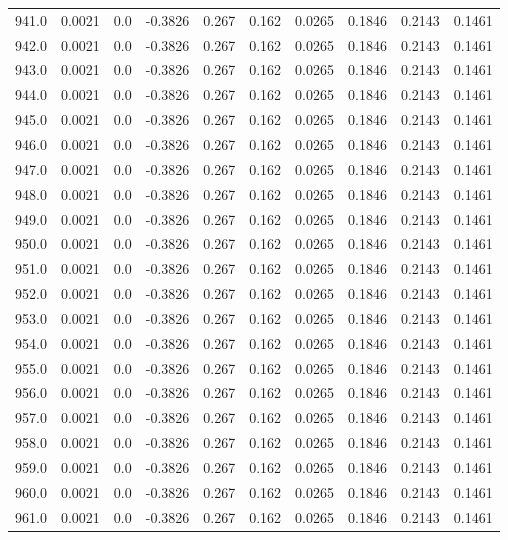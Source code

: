 \begin{longtable}{lrrrrrrrrr}
941.0 & 0.0021 & 0.0 & -0.3826 & 0.267 & 0.162 & 0.0265 & 0.1846 & 0.2143 & 0.1461 \\
942.0 & 0.0021 & 0.0 & -0.3826 & 0.267 & 0.162 & 0.0265 & 0.1846 & 0.2143 & 0.1461 \\
943.0 & 0.0021 & 0.0 & -0.3826 & 0.267 & 0.162 & 0.0265 & 0.1846 & 0.2143 & 0.1461 \\
944.0 & 0.0021 & 0.0 & -0.3826 & 0.267 & 0.162 & 0.0265 & 0.1846 & 0.2143 & 0.1461 \\
945.0 & 0.0021 & 0.0 & -0.3826 & 0.267 & 0.162 & 0.0265 & 0.1846 & 0.2143 & 0.1461 \\
946.0 & 0.0021 & 0.0 & -0.3826 & 0.267 & 0.162 & 0.0265 & 0.1846 & 0.2143 & 0.1461 \\
947.0 & 0.0021 & 0.0 & -0.3826 & 0.267 & 0.162 & 0.0265 & 0.1846 & 0.2143 & 0.1461 \\
948.0 & 0.0021 & 0.0 & -0.3826 & 0.267 & 0.162 & 0.0265 & 0.1846 & 0.2143 & 0.1461 \\
949.0 & 0.0021 & 0.0 & -0.3826 & 0.267 & 0.162 & 0.0265 & 0.1846 & 0.2143 & 0.1461 \\
950.0 & 0.0021 & 0.0 & -0.3826 & 0.267 & 0.162 & 0.0265 & 0.1846 & 0.2143 & 0.1461 \\
951.0 & 0.0021 & 0.0 & -0.3826 & 0.267 & 0.162 & 0.0265 & 0.1846 & 0.2143 & 0.1461 \\
952.0 & 0.0021 & 0.0 & -0.3826 & 0.267 & 0.162 & 0.0265 & 0.1846 & 0.2143 & 0.1461 \\
953.0 & 0.0021 & 0.0 & -0.3826 & 0.267 & 0.162 & 0.0265 & 0.1846 & 0.2143 & 0.1461 \\
954.0 & 0.0021 & 0.0 & -0.3826 & 0.267 & 0.162 & 0.0265 & 0.1846 & 0.2143 & 0.1461 \\
955.0 & 0.0021 & 0.0 & -0.3826 & 0.267 & 0.162 & 0.0265 & 0.1846 & 0.2143 & 0.1461 \\
956.0 & 0.0021 & 0.0 & -0.3826 & 0.267 & 0.162 & 0.0265 & 0.1846 & 0.2143 & 0.1461 \\
957.0 & 0.0021 & 0.0 & -0.3826 & 0.267 & 0.162 & 0.0265 & 0.1846 & 0.2143 & 0.1461 \\
958.0 & 0.0021 & 0.0 & -0.3826 & 0.267 & 0.162 & 0.0265 & 0.1846 & 0.2143 & 0.1461 \\
959.0 & 0.0021 & 0.0 & -0.3826 & 0.267 & 0.162 & 0.0265 & 0.1846 & 0.2143 & 0.1461 \\
960.0 & 0.0021 & 0.0 & -0.3826 & 0.267 & 0.162 & 0.0265 & 0.1846 & 0.2143 & 0.1461 \\
961.0 & 0.0021 & 0.0 & -0.3826 & 0.267 & 0.162 & 0.0265 & 0.1846 & 0.2143 & 0.1461 \\

\end{longtable}

